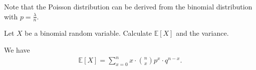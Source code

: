 
Note that the Poisson distribution can be derived from the binomial distribution with \( p = \frac{\lambda}{n} \).

\begin{eg}
	Let \( X  \) be a binomial random variable. Calculate \( \mathbb{E}[X] \) and the variance.
\end{eg}
\begin{explanation}
	We have
	\begin{align*}
		\mathbb{E}[X] = \sum_{x=0}^{n} x \cdot  \binom{n}{x} p^{x}  \cdot q^{n-x} 
	.\end{align*}
\end{explanation}
